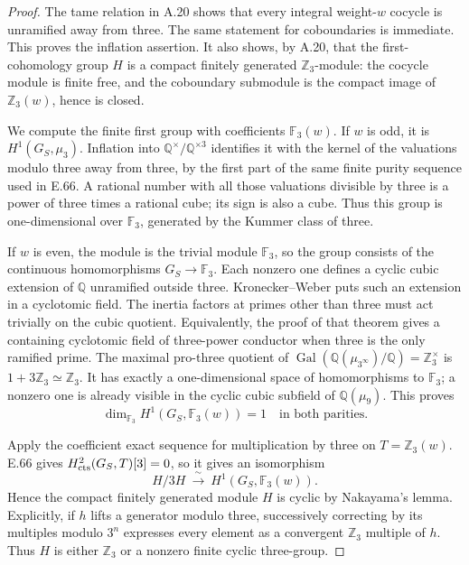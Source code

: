 \begin{proof}
The tame relation in A.20 shows that every integral
weight-$w$ cocycle is unramified away from three.
The same statement for coboundaries is immediate.
This proves the inflation assertion. It also shows,
by A.20, that the first-cohomology group $H$ is a compact
finitely generated $\mathbb Z_3$-module: the cocycle
module is finite free, and the coboundary submodule is
the compact image of $\mathbb Z_3(w)$, hence is closed.

We compute the finite first group with coefficients
$\mathbb F_3(w)$. If $w$ is odd, it is
$H^1(G_S,\mu_3)$. Inflation into
$\mathbb Q^\times/\mathbb Q^{\times3}$ identifies it
with the kernel of the valuations modulo three away
from three, by the first part of the same finite
purity sequence used in E.66. A rational number with
all those valuations divisible by three is a power
of three times a rational cube; its sign is also a
cube. Thus this group is one-dimensional over
$\mathbb F_3$, generated by the Kummer class of three.

If $w$ is even, the module is the trivial module
$\mathbb F_3$, so the group consists of the continuous
homomorphisms $G_S\to\mathbb F_3$. Each nonzero one
defines a cyclic cubic extension of $\mathbb Q$
unramified outside three. Kronecker--Weber
\cite[I.4.16 and its proof, pp.49--50]{RootMilneCFT}
puts such an extension in a cyclotomic field.
The inertia factors at primes other than three must
act trivially on the cubic quotient. Equivalently,
the proof of that theorem gives a containing
cyclotomic field of three-power conductor when
three is the only ramified prime.
The maximal pro-three quotient of
$\operatorname{Gal}(\mathbb Q(\mu_{3^\infty})/\mathbb Q)
=\mathbb Z_3^\times$ is
$1+3\mathbb Z_3\simeq\mathbb Z_3$.
It has exactly a one-dimensional space of
homomorphisms to $\mathbb F_3$; a nonzero one is
already visible in the cyclic cubic subfield of
$\mathbb Q(\mu_9)$. This proves
\[
 \dim_{\mathbb F_3}H^1(G_S,\mathbb F_3(w))=1
 \quad\text{in both parities}.
\]

Apply the coefficient exact sequence for multiplication
by three on $T=\mathbb Z_3(w)$. E.66 gives
$H^2_{\rm cts}(G_S,T)[3]=0$, so it gives an isomorphism
\[
 H/3H \ \xrightarrow{\ \sim\ }\
 H^1(G_S,\mathbb F_3(w)).
\]
Hence the compact finitely generated module $H$ is
cyclic by Nakayama's lemma. Explicitly, if $h$ lifts
a generator modulo three, successively correcting
by its multiples modulo $3^n$ expresses every
element as a convergent $\mathbb Z_3$ multiple of $h$.
Thus $H$ is either $\mathbb Z_3$ or a nonzero finite
cyclic three-group.


\end{proof}
